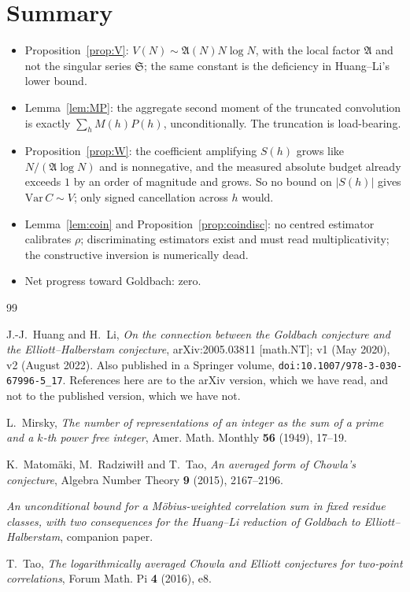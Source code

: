 \documentclass[11pt,a4paper]{article}
\theoremstyle{plain}
\theoremstyle{definition}
\theoremstyle{remark}
\renewcommand{\SS}{\mathfrak{S}}
\newcommand{\AAA}{\mathfrak{A}}
\begin{document}
\section{Summary}

\begin{itemize}
\item Proposition~\ref{prop:V}: $V(N)\sim\AAA(N)N\log N$, with the
local factor $\AAA$ and not the singular series $\SS$; the same
constant is the deficiency in Huang--Li's lower bound.

\item Lemma~\ref{lem:MP}: the aggregate second moment of the truncated
convolution is exactly $\sum_h M(h)P(h)$, unconditionally. The
truncation is load-bearing.

\item Proposition~\ref{prop:W}: the coefficient amplifying $S(h)$
grows like $N/(\AAA\log N)$ and is nonnegative, and the measured
absolute budget already exceeds $1$ by an order of magnitude and
grows. So no bound on $|S(h)|$ gives $\mathrm{Var}\,C\sim V$; only
signed cancellation across $h$ would.

\item Lemma~\ref{lem:coin} and Proposition~\ref{prop:coindisc}: no
centred estimator calibrates $\rho$; discriminating estimators exist
and must read multiplicativity; the constructive inversion is
numerically dead.

\item Net progress toward Goldbach: zero.
\end{itemize}

\begin{thebibliography}{99}

 J.-J.~Huang and H.~Li, \emph{On the connection between
the Goldbach conjecture and the Elliott--Halberstam conjecture},
arXiv:2005.03811 [math.NT]; v1 (May 2020), v2 (August 2022). Also
published in a Springer volume,
\texttt{doi:10.1007/978-3-030-67996-5\_17}. References here are to the
arXiv version, which we have read, and not to the published version,
which we have not.

 L.~Mirsky, \emph{The number of representations of an
integer as the sum of a prime and a $k$-th power free integer},
Amer. Math. Monthly \textbf{56} (1949), 17--19.

 K.~Matom\"aki, M.~Radziwi{\l}{\l} and T.~Tao,
\emph{An averaged form of Chowla's conjecture}, Algebra Number Theory
\textbf{9} (2015), 2167--2196.

 \emph{An unconditional bound for a M\"obius-weighted
correlation sum in fixed residue classes, with two consequences for
the Huang--Li reduction of Goldbach to Elliott--Halberstam},
companion paper.

 T.~Tao, \emph{The logarithmically averaged Chowla and
Elliott conjectures for two-point correlations}, Forum Math. Pi
\textbf{4} (2016), e8.

\end{thebibliography}
\end{document}
